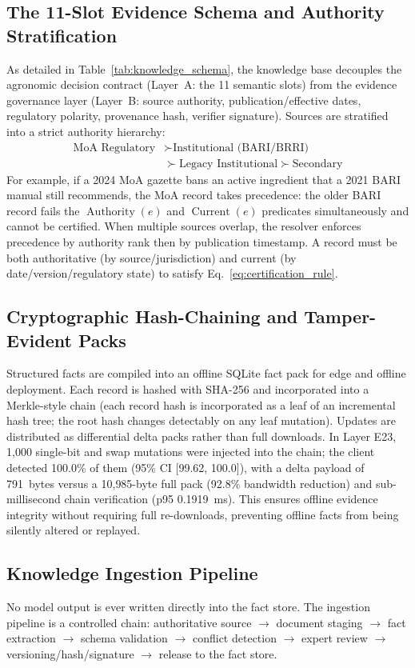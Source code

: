 \subsection{The 11-Slot Evidence Schema and Authority Stratification}
As detailed in Table~\ref{tab:knowledge_schema}, the knowledge base decouples the agronomic decision contract (Layer~A: the 11 semantic slots) from the evidence governance layer (Layer~B: source authority, publication/effective dates, regulatory polarity, provenance hash, verifier signature). Sources are stratified into a strict authority hierarchy:
\begin{align}
    \text{MoA Regulatory} &\succ \text{Institutional (BARI/BRRI)} \nonumber \\
    &\succ \text{Legacy Institutional} \succ \text{Secondary}
\end{align}
For example, if a 2024 MoA gazette bans an active ingredient that a 2021 BARI manual still recommends, the MoA record takes precedence: the older BARI record fails the $\operatorname{Authority}(e)$ and $\operatorname{Current}(e)$ predicates simultaneously and cannot be certified. When multiple sources overlap, the resolver enforces precedence by authority rank then by publication timestamp. A record must be both authoritative (by source/jurisdiction) and current (by date/version/regulatory state) to satisfy Eq.~\eqref{eq:certification_rule}.

\subsection{Cryptographic Hash-Chaining and Tamper-Evident Packs}
Structured facts are compiled into an offline SQLite fact pack for edge and offline deployment. Each record is hashed with SHA-256 and incorporated into a Merkle-style chain (each record hash is incorporated as a leaf of an incremental hash tree; the root hash changes detectably on any leaf mutation). Updates are distributed as differential delta packs rather than full downloads. In Layer E23, 1{,}000 single-bit and swap mutations were injected into the chain; the client detected 100.0\% of them (95\% CI [99.62, 100.0]), with a delta payload of 791~bytes versus a 10{,}985-byte full pack (92.8\% bandwidth reduction) and sub-millisecond chain verification (p95 0.1919~ms). This ensures offline evidence integrity without requiring full re-downloads, preventing offline facts from being silently altered or replayed.

\subsection{Knowledge Ingestion Pipeline}
No model output is ever written directly into the fact store. The ingestion pipeline is a controlled chain: authoritative source $\rightarrow$ document staging $\rightarrow$ fact extraction $\rightarrow$ schema validation $\rightarrow$ conflict detection $\rightarrow$ expert review $\rightarrow$ versioning/hash/signature $\rightarrow$ release to the fact store.

